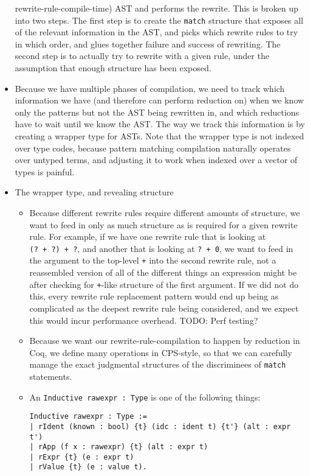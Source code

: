 \documentclass[
]{article}
\begin{document}
\begin{itemize}
  rewrite-rule-compile-time) AST and performs the rewrite. This is
  broken up into two steps. The first step is to create the
  \texttt{match} structure that exposes all of the relevant information
  in the AST, and picks which rewrite rules to try in which order, and
  glues together failure and success of rewriting. The second step is to
  actually try to rewrite with a given rule, under the assumption that
  enough structure has been exposed.
\item
  Because we have multiple phases of compilation, we need to track which
  information we have (and therefore can perform reduction on) when we
  know only the patterns but not the AST being rewritten in, and which
  reductions have to wait until we know the AST. The way we track this
  information is by creating a wrapper type for ASTs. Note that the
  wrapper type is not indexed over type codes, because pattern matching
  compilation naturally operates over untyped terms, and adjusting it to
  work when indexed over a vector of types is painful.
\item
  The wrapper type, and revealing structure

  \begin{itemize}
  \item
    Because different rewrite rules require different amounts of
    structure, we want to feed in only as much structure as is required
    for a given rewrite rule. For example, if we have one rewrite rule
    that is looking at \texttt{(?\ +\ ?)\ +\ ?}, and another that is
    looking at \texttt{?\ +\ 0}, we want to feed in the argument to the
    top-level \texttt{+} into the second rewrite rule, not a reassembled
    version of all of the different things an expression might be after
    checking for \texttt{+}-like structure of the first argument. If we
    did not do this, every rewrite rule replacement pattern would end up
    being as complicated as the deepest rewrite rule being considered,
    and we expect this would incur performance overhead. TODO: Perf
    testing?
  \item
    Because we want our rewrite-rule-compilation to happen by reduction
    in Coq, we define many operations in CPS-style, so that we can
    carefully manage the exact judgmental structures of the discriminees
    of \texttt{match} statements.
  \item
    An \texttt{Inductive\ rawexpr\ :\ Type} is one of the following
    things:

\begin{verbatim}
Inductive rawexpr : Type :=
| rIdent (known : bool) {t} (idc : ident t) {t'} (alt : expr t')
| rApp (f x : rawexpr) {t} (alt : expr t)
| rExpr {t} (e : expr t)
| rValue {t} (e : value t).
\end{verbatim}


\end{itemize}
\end{itemize}
\end{document}
